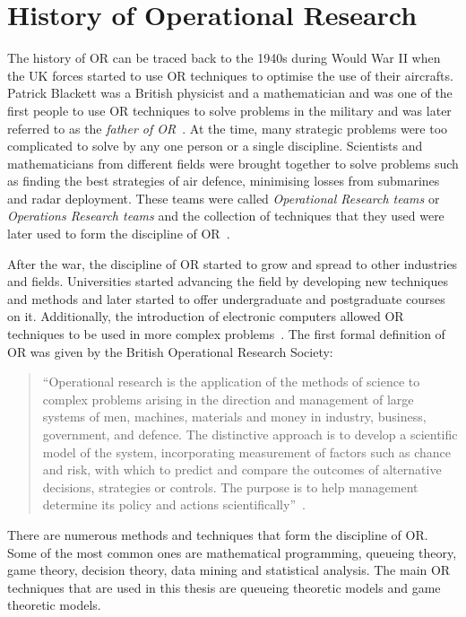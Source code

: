\section{History of Operational Research}\label{sec:intro_or_history}

The history of OR can be traced back to the 1940s during Would War II when the
UK forces started to use OR techniques to optimise the use of their aircrafts.
Patrick Blackett was a British physicist and a mathematician and was one of the
first people to use OR techniques to solve problems in the military and was
later referred to as the \textit{father of OR}~\cite{blackett1962studies}.
At the time, many strategic problems were too complicated to solve by any one
person or a single discipline.
Scientists and mathematicians from different fields were brought together to
solve problems such as finding the best strategies of air defence, minimising
losses from submarines and radar deployment.
These teams were called \textit{Operational Research teams} or
\textit{Operations Research teams} and the collection of techniques that they
used were later used to form the discipline of
OR~\cite{ravindran2008operations}.

After the war, the discipline of OR started to grow and spread to other
industries and fields.
Universities started advancing the field by developing new techniques and
methods and later started to offer undergraduate and postgraduate courses on it.
Additionally, the introduction of electronic computers allowed OR techniques to
be used in more complex problems~\cite{ravindran2008operations}.
The first formal definition of OR was given by the British Operational
Research Society:

\begin{quotation}
    ``Operational research is the application of the methods of science to
    complex problems arising in the direction and management of large systems of
    men, machines, materials and money in industry, business, government, and
    defence.
    The distinctive approach is to develop a scientific model of the system,
    incorporating measurement of factors such as chance and risk, with which to
    predict and compare the outcomes of alternative decisions, strategies or
    controls.
    The purpose is to help management determine its policy and actions
    scientifically''~\cite{or_for_multi_organizations}.
\end{quotation}

There are numerous methods and techniques that form the discipline of OR.
Some of the most common ones are mathematical programming, queueing theory,
game theory, decision theory, data mining and statistical analysis.
The main OR techniques that are used in this thesis are queueing theoretic
models and game theoretic models.

